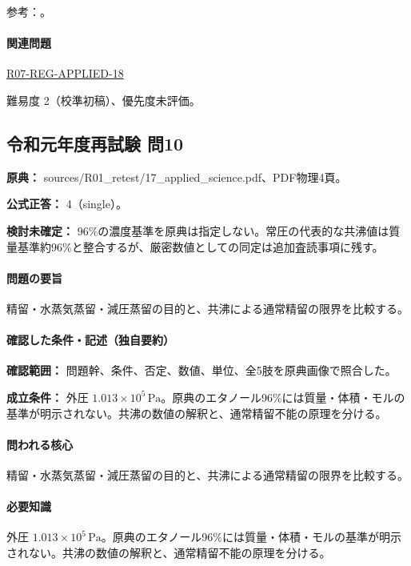 \par 参考：\cite{nptel_distillation1}。

\paragraph{関連問題} \hyperref[q:r07-reg-applied-18]{R07-REG-APPLIED-18}

\par 難易度 2（校準初稿）、優先度未評価。

\subsection{令和元年度再試験 問10}
\label{q:r01-ret-applied-10}

\noindent\textbf{原典：} sources/R01\_retest/17\_applied\_science.pdf、PDF物理4頁。

\textbf{公式正答：} 4（single）。

\par\textbf{検討未確定：} 96\%の濃度基準を原典は指定しない。常圧の代表的な共沸値は質量基準約96\%と整合するが、厳密数値としての同定は追加査読事項に残す。

\paragraph{問題の要旨} 精留・水蒸気蒸留・減圧蒸留の目的と、共沸による通常精留の限界を比較する。

\paragraph{確認した条件・記述（独自要約）}\mbox{}\par

\noindent\textbf{確認範囲：} 問題幹、条件、否定、数値、単位、全5肢を原典画像で照合した。\par

\noindent\textbf{成立条件：} 外圧 \(1.013\times10^5\,\mathrm{Pa}\)。原典のエタノール96\%には質量・体積・モルの基準が明示されない。共沸の数値の解釈と、通常精留不能の原理を分ける。\par

\paragraph{問われる核心} 精留・水蒸気蒸留・減圧蒸留の目的と、共沸による通常精留の限界を比較する。

\paragraph{必要知識} 外圧 \(1.013\times10^5\,\mathrm{Pa}\)。原典のエタノール96\%には質量・体積・モルの基準が明示されない。共沸の数値の解釈と、通常精留不能の原理を分ける。

